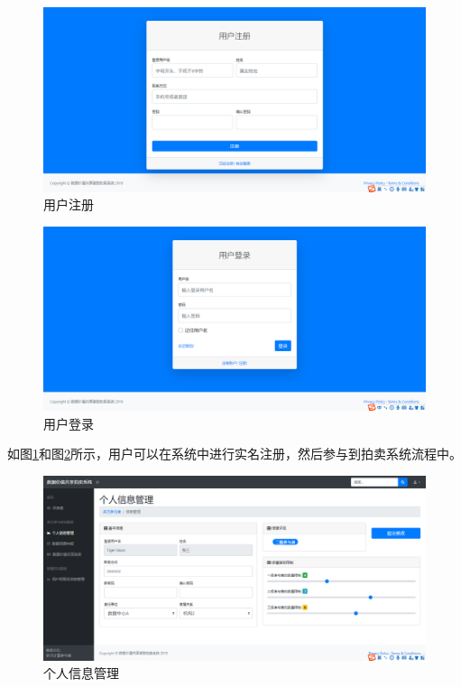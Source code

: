 \documentclass[promaster]{thesis-uestc}
\begin{document}
\begin{figure}[H]
    \includegraphics[width=400pt]{ui/register.png}
    \caption{用户注册}
    \label{register}
\end{figure}

\begin{figure}[H]
    \includegraphics[width=400pt]{ui/login.png}
    \caption{用户登录}
    \label{login}
\end{figure}

如图\ref{register}和图\ref{login}所示，用户可以在系统中进行实名注册，然后参与到拍卖系统流程中。

\begin{figure}[H]
    \includegraphics[width=400pt]{ui/gerenxinxiguanli.png}
    \caption{个人信息管理}
    \label{gerenxinxi}
\end{figure}
\end{document}
